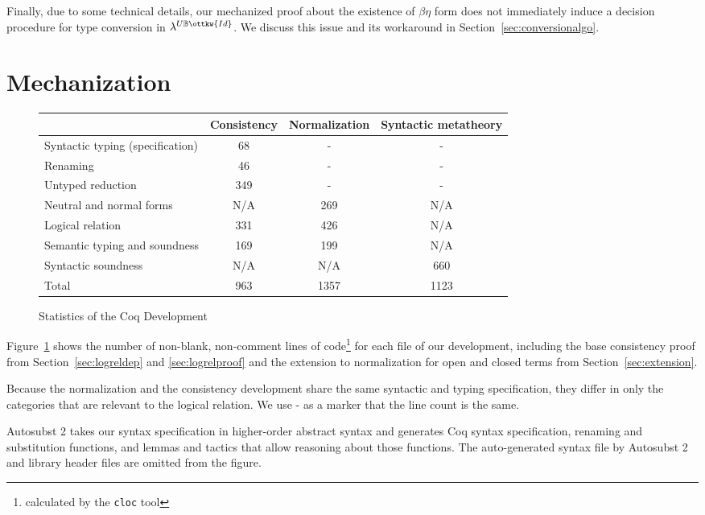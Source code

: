 \documentclass[acmsmall,screen=true,
\ifpublic review=false\else,review=true\fi
  ,anonymous=\ifanonymous true\else false\fi]{acmart}
\newcommand{\lang}{$\lambda^{U\mathbb{B}\ottkw{Id}}$\xspace}
\begin{document}
Finally, due to some technical
details, our mechanized proof about the existence of $\beta\eta$ form does not
immediately induce a decision procedure for type conversion in
\lang{}. We discuss this issue and its workaround in
Section~\ref{sec:conversionalgo}.
\section{Mechanization}
\label{sec:logrelmech}
\begin{figure}[h]
  \begin{minipage}{0.9\textwidth}
  \begin{tabular}{ l |  c  | c | c }
    & Consistency & Normalization & Syntactic metatheory \\
    \hline
    Syntactic typing (specification) &  68 & - & - \\
    Renaming & 46 & -  & - \\
    Untyped reduction & 349 & - & - \\
    Neutral and normal forms & N/A & 269 & N/A \\
    Logical relation & 331 & 426 & N/A \\
    Semantic typing and soundness & 169 & 199 & N/A \\
    Syntactic soundness & N/A & N/A  & 660 \\
    \hline
    Total & 963 & 1357 & 1123 \\
  \end{tabular}
  \end{minipage}
  \caption{Statistics of the Coq Development}
  \label{fig:linecount}
\end{figure}

Figure~\ref{fig:linecount} shows the number of non-blank, non-comment lines of
code\footnote{calculated by the \texttt{cloc} tool} for each file of our
development, including the base consistency proof from
Section~\ref{sec:logreldep} and \ref{sec:logrelproof} and the extension to
normalization for open and closed terms from Section~\ref{sec:extension}.

Because the normalization and the consistency development share the same
syntactic and typing specification, they differ in only the categories
that are relevant to the logical relation. We use - as a marker that
the line count is the same.

Autosubst 2 takes our syntax specification in higher-order abstract
syntax and generates Coq syntax specification, renaming and
substitution functions, and lemmas and tactics that allow reasoning
about those functions. The auto-generated syntax file by Autosubst 2
and library header files are omitted from the figure.
\end{document}

